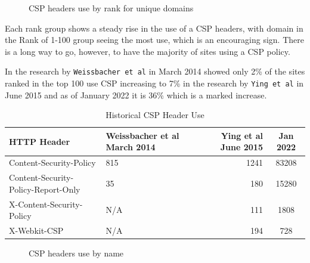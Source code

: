 \documentclass{mscreport}
\begin{document}
\begin{figure}[H]
	\begin{center}
		\caption{CSP headers use by rank for unique domains}
		\label{fig:csp_by_rank}
	\end{center}
\end{figure}



\vspace{0.3cm} \noindent
Each rank group shows a steady rise in the use of a CSP headers, with domain in the Rank of 1-100 group seeing the most use, which is an encouraging sign. There is a long way to go, however, to have the majority of sites using a CSP policy.

\vspace{0.3cm} \noindent
In the research by \texttt{Weissbacher et al} \cite{Weissbacher2014-vm} in March 2014 showed only 2\% of the sites ranked in the top 100 use CSP increasing to 7\% in the research by \texttt{Ying et al} \cite{Ying2016-ag} in June 2015 and as of January 2022 it is 36\% which is a marked increase.

\newpage


\begin{table}[t]
\footnotesize
  \begin{center}
    \begin{tabular}{|l|I|D|c|}  %
      \hline
      \textbf{HTTP Header} & \textbf{Weissbacher et al} \cite{Weissbacher2014-vm} March 2014 & \textbf{Ying et al} \cite{Ying2016-ag} June 2015 & Jan 2022 \\
      \hline
      Content-Security-Policy & 815 & 1241 & 83208\\
      \hline
      Content-Security-Policy-Report-Only & 35 & 180 & 15280\\
      \hline
      X-Content-Security-Policy & N/A & 111 & 1808\\
      \hline
      X-Webkit-CSP & N/A & 194 & 728\\
      \hline
    \end{tabular}
    \caption{Historical CSP Header Use}
    \label{table:csp_header_count} %
  \end{center}
\end{table}

\begin{figure}[H]
	\begin{center}
		\caption{CSP headers use by name}
		\label{fig:csp_by_rank}
	\end{center}
\end{figure}
\end{document}

